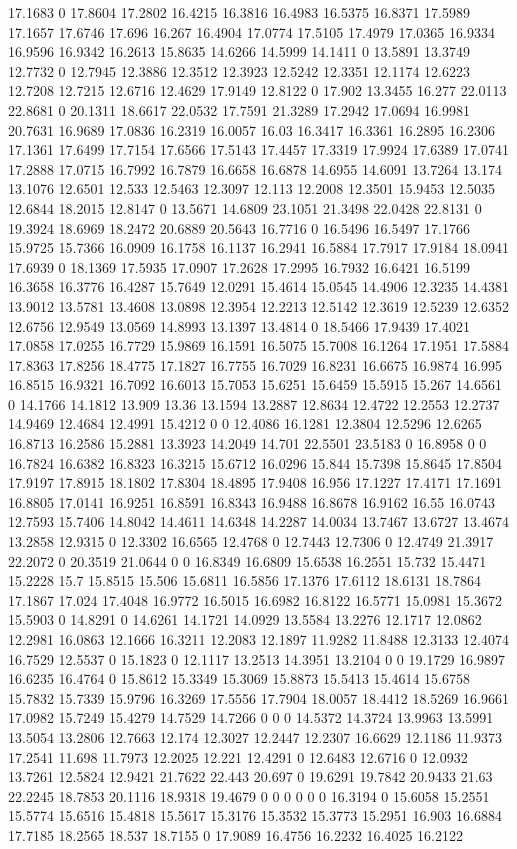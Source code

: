 17.1683 0 17.8604 17.2802 16.4215 16.3816 16.4983 16.5375 16.8371 17.5989 17.1657 17.6746 17.696 16.267 16.4904 17.0774 17.5105 17.4979 17.0365 16.9334 16.9596 16.9342 16.2613 15.8635 14.6266 14.5999 14.1411 0 13.5891 13.3749 12.7732 0 12.7945 12.3886 12.3512 12.3923 12.5242 12.3351 12.1174 12.6223 12.7208 12.7215 12.6716 12.4629 17.9149 12.8122 0 17.902 13.3455 16.277 22.0113 22.8681 0 20.1311 18.6617 22.0532 17.7591 21.3289 17.2942 17.0694 16.9981 20.7631 16.9689 17.0836 16.2319 16.0057 16.03 16.3417 16.3361 16.2895 16.2306 17.1361 17.6499 17.7154 17.6566 17.5143 17.4457 17.3319 17.9924 17.6389 17.0741 17.2888 17.0715 16.7992 16.7879 16.6658 16.6878 14.6955 14.6091 13.7264 13.174 13.1076 12.6501 12.533 12.5463 12.3097 12.113 12.2008 12.3501 15.9453 12.5035 12.6844 18.2015 12.8147 0 13.5671 14.6809 23.1051 21.3498 22.0428 22.8131 0 19.3924 18.6969 18.2472 20.6889 20.5643 16.7716 0 16.5496 16.5497 17.1766 15.9725 15.7366 16.0909 16.1758 16.1137 16.2941 16.5884 17.7917 17.9184 18.0941 17.6939 0 18.1369 17.5935 17.0907 17.2628 17.2995 16.7932 16.6421 16.5199 16.3658 16.3776 16.4287 15.7649 12.0291 15.4614 15.0545 14.4906 12.3235 14.4381 13.9012 13.5781 13.4608 13.0898 12.3954 12.2213 12.5142 12.3619 12.5239 12.6352 12.6756 12.9549 13.0569 14.8993 13.1397 13.4814 0 18.5466 17.9439 17.4021 17.0858 17.0255 16.7729 15.9869 16.1591 16.5075 15.7008 16.1264 17.1951 17.5884 17.8363 17.8256 18.4775 17.1827 16.7755 16.7029 16.8231 16.6675 16.9874 16.995 16.8515 16.9321 16.7092 16.6013 15.7053 15.6251 15.6459 15.5915 15.267 14.6561 0 14.1766 14.1812 13.909 13.36 13.1594 13.2887 12.8634 12.4722 12.2553 12.2737 14.9469 12.4684 12.4991 15.4212 0 0 12.4086 16.1281 12.3804 12.5296 12.6265 16.8713 16.2586 15.2881 13.3923 14.2049 14.701 22.5501 23.5183 0 16.8958 0 0 16.7824 16.6382 16.8323 16.3215 15.6712 16.0296 15.844 15.7398 15.8645 17.8504 17.9197 17.8915 18.1802 17.8304 18.4895 17.9408 16.956 17.1227 17.4171 17.1691 16.8805 17.0141 16.9251 16.8591 16.8343 16.9488 16.8678 16.9162 16.55 16.0743 12.7593 15.7406 14.8042 14.4611 14.6348 14.2287 14.0034 13.7467 13.6727 13.4674 13.2858 12.9315 0 12.3302 16.6565 12.4768 0 12.7443 12.7306 0 12.4749 21.3917 22.2072 0 20.3519 21.0644 0 0 16.8349 16.6809 15.6538 16.2551 15.732 15.4471 15.2228 15.7 15.8515 15.506 15.6811 16.5856 17.1376 17.6112 18.6131 18.7864 17.1867 17.024 17.4048 16.9772 16.5015 16.6982 16.8122 16.5771 15.0981 15.3672 15.5903 0 14.8291 0 14.6261 14.1721 14.0929 13.5584 13.2276 12.1717 12.0862 12.2981 16.0863 12.1666 16.3211 12.2083 12.1897 11.9282 11.8488 12.3133 12.4074 16.7529 12.5537 0 15.1823 0 12.1117 13.2513 14.3951 13.2104 0 0 19.1729 16.9897 16.6235 16.4764 0 15.8612 15.3349 15.3069 15.8873 15.5413 15.4614 15.6758 15.7832 15.7339 15.9796 16.3269 17.5556 17.7904 18.0057 18.4412 18.5269 16.9661 17.0982 15.7249 15.4279 14.7529 14.7266 0 0 0 14.5372 14.3724 13.9963 13.5991 13.5054 13.2806 12.7663 12.174 12.3027 12.2447 12.2307 16.6629 12.1186 11.9373 17.2541 11.698 11.7973 12.2025 12.221 12.4291 0 12.6483 12.6716 0 12.0932 13.7261 12.5824 12.9421 21.7622 22.443 20.697 0 19.6291 19.7842 20.9433 21.63 22.2245 18.7853 20.1116 18.9318 19.4679 0 0 0 0 0 0 16.3194 0 15.6058 15.2551 15.5774 15.6516 15.4818 15.5617 15.3176 15.3532 15.3773 15.2951 16.903 16.6884 17.7185 18.2565 18.537 18.7155 0 17.9089 16.4756 16.2232 16.4025 16.2122 